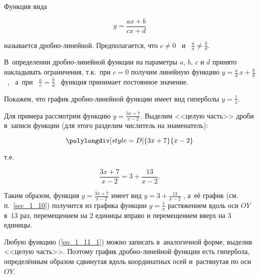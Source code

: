 \begin{Def}
Функция вида

\begin{equation}\label{eq_1_11_1}
y = \frac{ax + b}{cx + d}
\end{equation}

называется дробно-линейной.
Предполагается, что $c \ne 0$ \, и \, $\displaystyle \frac{a}{a} \ne \frac{b}{d}$.
\end{Def}

В~определении дробно-линейной функции на параметры $a$, $b$, $c$ и $d$
принято накладывать ограничения, т.к.\ при $c = 0$ получим линейную функцию
$\displaystyle y = \frac{a}{d} \, x + \frac{b}{d}$ \, , \,
а~при \, $\displaystyle \frac{a}{c} = \frac{b}{d}$ \,
функция принимает постоянное значение.

Покажем, что график дробно-линейной функции имеет вид гиперболы
$\displaystyle y = \frac{1}{x}$.

Для примера рассмотрим функцию $\displaystyle y = \frac{3x + 7}{x - 2}$.
Выделим <<целую часть>> дроби в~записи функции (для этого разделим
числитель на знаменатель):

\begin{equation*}
\polylongdiv[style=D]{3x+7}{x-2}
\end{equation*}

т.е.\

\begin{equation*}
\frac{3x + 7}{x - 2} = 3 + \frac{13}{x - 2}.
\end{equation*}

Таким образом, функция $\displaystyle y = \frac{3x + 7}{x - 2}$
имеет вид $\displaystyle y = 3 + \frac{13}{x - 2}$ ,
а~её график (см. п.\ \ref{sec_1_10}) получится из графика функции
$\displaystyle y = \frac{1}{x}$ растяжением вдоль оси $OY$ в~13 раз,
перемещением на 2 единицы вправо и перемещением вверх на 3 единицы.

Любую функцию (\ref{eq_1_11_1}) можно записать в~аналогичной форме,
выделив <<целую часть>>. Поэтому график дробно-линейной функции
есть гипербола, определённым образом сдвинутая вдоль координатных осей
и~растянутая по оси $OY$.
